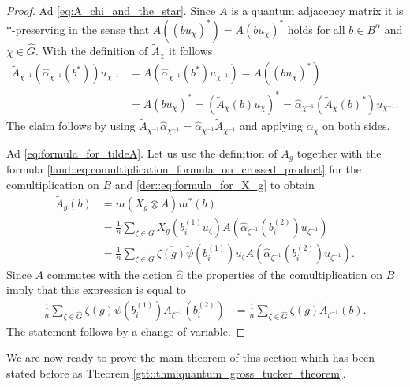 \documentclass{amsart}
\theoremstyle{definition}
\theoremstyle{definition}
\begin{document}
\begin{proof}
    Ad \eqref{eq:A_chi_and_the_star}.
    Since $A$ is a quantum adjacency matrix it is $\ast$-preserving in the sense that $A\left(\left(b u_\chi\right)^\ast\right) = A(b u_\chi)^\ast$ holds for all $b \in B^\alpha$ and $\chi \in \hat{G}$. With the definition of $\tilde{A}_\chi$ it follows
    \begin{align*}
        \tilde{A}_{\chi^{-1}}(\hat{\alpha}_{\chi^{-1}}(b^\ast)) u_{\chi^{-1}}
            &= A(\hat{\alpha}_{\chi^{-1}}(b^\ast) u_{\chi^{-1}}) 
            = A\left((b u_\chi)^\ast\right) \\
            &= A(b u_\chi)^\ast 
            = \left( \tilde{A}_\chi(b) u_\chi \right)^\ast 
            = \hat{\alpha}_{\chi^{-1}}\left(\tilde{A}_\chi(b)^\ast\right) u_{\chi^{-1}}.
    \end{align*}
    The claim follows by using $\tilde{A}_{\chi^{-1}} \hat{\alpha}_{\chi^{-1}} = \hat{\alpha}_{\chi^{-1}} \tilde{A}_{\chi^{-1}}$ and applying $\hat{\alpha}_\chi$ on both sides.

    Ad \eqref{eq:formula_for_tildeA}. 
    Let us use the definition of $\tilde{A}_g$ together with the formula \eqref{land::eq:comultiplication_formula_on_crossed_product} for the comultiplication on $B$ and \eqref{der::eq:formula_for_X_g} to obtain
    \begin{align*}
        \tilde{A}_g(b) 
            &= m(X_g \otimes A) m^\ast(b) \\
            &= \frac{1}{n} \sum_{\zeta \in \hat{G}} X_g(b_i^{(1)} u_\zeta) A\left( \hat{\alpha}_{\zeta^{-1}}\left(b_i^{(2)}\right) u_{\zeta^{-1}}\right) \\
            &= \frac{1}{n} \sum_{\zeta \in \hat{G}} \overline{\zeta(g)} \tilde{\psi}(b_i^{(1)}) u_\zeta A\left( \hat{\alpha}_{\zeta^{-1}}\left(b_i^{(2)}\right) u_{\zeta^{-1}}\right). 
    \end{align*}
    Since $A$ commutes with the action $\hat{\alpha}$ the properties of the comultiplication on $B$ imply that this expression is equal to
    \begin{align*}
        \frac{1}{n} \sum_{\zeta \in \hat{G}} \overline{\zeta(g)} \tilde{\psi}(b_i^{(1)}) A_{\zeta^{-1}}\left( b_i^{(2)} \right)
            &= \frac{1}{n} \sum_{\zeta \in \hat{G}} \overline{\zeta(g)} \tilde{A}_{\zeta^{-1}}(b).
    \end{align*}
    The statement follows by a change of variable.
\end{proof}

We are now ready to prove the main theorem of this section which has been stated before as Theorem \ref{gtt::thm:quantum_gross_tucker_theorem}.
\end{document}

